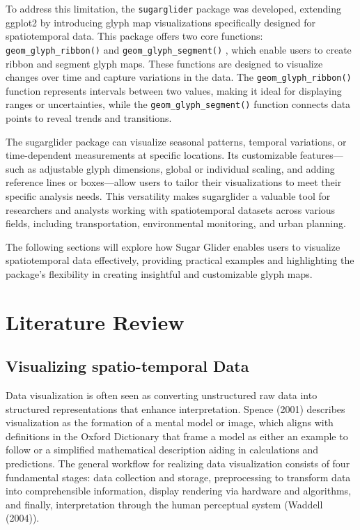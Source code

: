 To address this limitation, the \texttt{sugarglider} package was developed, extending ggplot2 by introducing glyph map visualizations specifically designed for spatiotemporal data. This package offers two core functions: \texttt{geom\_glyph\_ribbon()} and \texttt{geom\_glyph\_segment()} , which enable users to create ribbon and segment glyph maps. These functions are designed to visualize changes over time and capture variations in the data. The \texttt{geom\_glyph\_ribbon()} function represents intervals between two values, making it ideal for displaying ranges or uncertainties, while the \texttt{geom\_glyph\_segment()} function connects data points to reveal trends and transitions.

The sugarglider package can visualize seasonal patterns, temporal variations, or time-dependent measurements at specific locations. Its customizable features---such as adjustable glyph dimensions, global or individual scaling, and adding reference lines or boxes---allow users to tailor their visualizations to meet their specific analysis needs. This versatility makes sugarglider a valuable tool for researchers and analysts working with spatiotemporal datasets across various fields, including transportation, environmental monitoring, and urban planning.

The following sections will explore how Sugar Glider enables users to visualize spatiotemporal data effectively, providing practical examples and highlighting the package's flexibility in creating insightful and customizable glyph maps.

\hypertarget{literature-review}{%
\section{Literature Review}\label{literature-review}}

\hypertarget{visualizing-spatio-temporal-data}{%
\subsection{Visualizing spatio-temporal Data}\label{visualizing-spatio-temporal-data}}

Data visualization is often seen as converting unstructured raw data into structured representations that enhance interpretation. Spence (2001) describes visualization as the formation of a mental model or image, which aligns with definitions in the Oxford Dictionary that frame a model as either an example to follow or a simplified mathematical description aiding in calculations and predictions. The general workflow for realizing data visualization consists of four fundamental stages: data collection and storage, preprocessing to transform data into comprehensible information, display rendering via hardware and algorithms, and finally, interpretation through the human perceptual system (Waddell (2004)).

